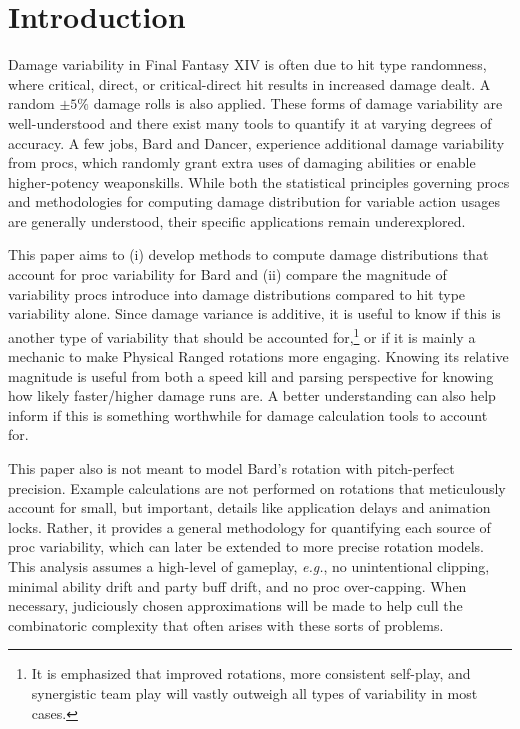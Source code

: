 \section{Introduction}

Damage variability in Final Fantasy XIV is often due to hit type randomness, where critical, direct, or critical-direct hit results in increased damage dealt. A random $\pm 5\%$ damage rolls is also applied. These forms of damage variability are well-understood and there exist many tools to quantify it at varying degrees of accuracy. A few jobs, Bard and Dancer, experience additional damage variability from procs, which randomly grant extra uses of damaging abilities or enable higher-potency weaponskills. While both the statistical principles governing procs and methodologies for computing damage distribution for variable action usages are generally understood, their specific applications remain underexplored.

This paper aims to (i) develop methods to compute damage distributions that account for proc variability for Bard and (ii) compare the magnitude of variability procs introduce into damage distributions compared to hit type variability alone. Since damage variance is additive, it is useful to know if this is another type of variability that should be accounted for,\footnote{It is emphasized that improved rotations, more consistent self-play, and synergistic team play will vastly outweigh all types of variability in most cases.} or if it is mainly a mechanic to make Physical Ranged rotations more engaging. Knowing its relative magnitude is useful from both a speed kill and parsing perspective for knowing how likely faster/higher damage runs are. A better understanding can also help inform if this is something worthwhile for damage calculation tools to account for.

This paper also is not meant to model Bard's rotation with pitch-perfect precision. Example calculations are not performed on rotations that meticulously account for small, but important, details like application delays and animation locks. Rather, it provides a general methodology for quantifying each source of proc variability, which can later be extended to more precise rotation models. This analysis assumes a high-level of gameplay, \textit{e.g.}, no unintentional clipping, minimal ability drift and party buff drift, and no proc over-capping. When necessary, judiciously chosen approximations will be made to help cull the combinatoric complexity that often arises with these sorts of problems.
